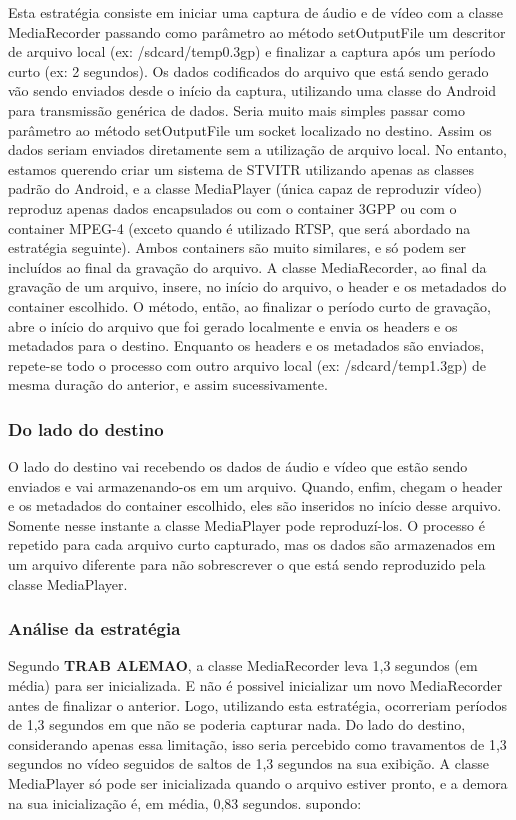\documentclass{acm_proc_article-sp}
\newcommand{\todo}[1]{\textcolor[rgb]{1.00,0.00,0.00}{\bf \uppercase{#1}}}
\begin{document}
Esta estratégia consiste em iniciar uma captura de áudio e de vídeo com a classe MediaRecorder passando como parâmetro ao método setOutputFile um descritor de arquivo local (ex: /sdcard/temp0.3gp) e finalizar a captura após um período curto (ex: 2 segundos). Os dados codificados do arquivo que está sendo gerado vão sendo enviados desde o início da captura, utilizando uma classe do Android para transmissão genérica de dados. Seria muito mais simples passar como parâmetro ao método setOutputFile um socket localizado no destino. Assim os dados seriam enviados diretamente sem a utilização de arquivo local. No entanto, estamos querendo criar um sistema de STVITR utilizando apenas as classes padrão do Android, e a classe MediaPlayer (única capaz de reproduzir vídeo) reproduz apenas dados encapsulados ou com o container 3GPP ou com o container MPEG-4 (exceto quando é utilizado RTSP, que será abordado na estratégia seguinte). Ambos containers são muito similares, e só podem ser incluídos ao final da gravação do arquivo. A classe MediaRecorder, ao final da gravação de um arquivo, insere, no início do arquivo, o header e os metadados do container escolhido. O método, então, ao finalizar o período curto de gravação, abre o início do arquivo que foi gerado localmente e envia os headers e os metadados para o destino. Enquanto os headers e os metadados são enviados, repete-se todo o processo com outro arquivo local (ex: /sdcard/temp1.3gp) de mesma duração do anterior, e assim sucessivamente.

\subsubsection{Do lado do destino}

O lado do destino vai recebendo os dados de áudio e vídeo que estão sendo enviados e vai armazenando-os em um arquivo. Quando, enfim, chegam o header e os metadados do container escolhido, eles são inseridos no início desse arquivo. Somente nesse instante a classe MediaPlayer pode reproduzí-los. O processo é repetido para cada arquivo curto capturado, mas os dados são armazenados em um arquivo diferente para não sobrescrever o que está sendo reproduzido pela classe MediaPlayer.

\subsubsection{Análise da estratégia}

Segundo \todo{trab alemao}, a classe MediaRecorder leva 1,3 segundos (em média) para ser inicializada. E não é possivel inicializar um novo MediaRecorder antes de finalizar o anterior. Logo, utilizando esta estratégia, ocorreriam períodos de 1,3 segundos em que não se poderia capturar nada. Do lado do destino, considerando apenas essa limitação, isso seria percebido como travamentos de 1,3 segundos no vídeo seguidos de saltos de 1,3 segundos na sua exibição. A classe MediaPlayer só pode ser inicializada quando o arquivo estiver pronto, e a demora na sua inicialização é, em média, 0,83 segundos.
supondo:
\end{document}
